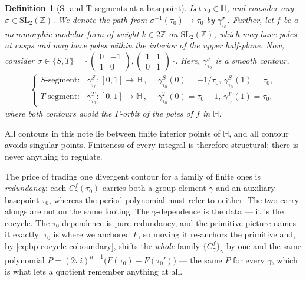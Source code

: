 \documentclass[11pt]{article}
\newtheorem{definition}[theorem]{Definition}
\numberwithin{equation}{section}  %
\newcommand{\HH}{\mathbb{H}}
\newcommand{\ZZ}{\mathbb{Z}}
\newcommand{\SLZ}{\mathrm{SL}_2(\ZZ)}
\begin{document}
\begin{definition}[S- and T-segments at a basepoint]\label{def:contours}
Let $\tau_0 \in \HH$, and consider any $\sigma \in \SLZ$. We denote the
path from $\sigma^{-1}(\tau_0) \to \tau_0$ by
$\gamma^\sigma_{\tau_0}$.
Further, let $f$ be a meromorphic modular form of weight $k \in 2\ZZ$ on
$\SLZ$, which may have poles at cusps and may have poles within the
interior of the upper half-plane.
Now, consider $\sigma \in \{ S, T \} = 
\{ \left( \begin{smallmatrix} 0 & -1 \\ 1 & 0 \end{smallmatrix}\right), 
\left( \begin{smallmatrix} 1 & 1 \\ 0 & 1 \end{smallmatrix}\right) \}$. Here, 
$\gamma^\sigma_{\tau_0}$ is a smooth contour,
\begin{align}
\begin{cases}
  S\text{-segment}\colon\:\:\; \gamma^S_{\tau_0}:[0, 1] \to \HH~,&~~
  \gamma^S_{\tau_0}(0)=-1/\tau_0,\, \gamma^S_{\tau_0}(1) =\tau_0,
  \\
  T\text{-segment}\colon\:\:\; \gamma^T_{\tau_0}:[0, 1] \to \HH~,&~~
  \gamma^T_{\tau_0}(0)=\tau_0-1,\, \gamma^T_{\tau_0}(1) =\tau_0,
\end{cases}
\label{eq:contour-pair}
\end{align}
where both contours avoid the $\Gamma$-orbit of the poles of $f$ in
$\HH$.
\end{definition}
 
All contours in this note lie between finite interior points of $\HH$, 
and all contour avoids singular points.  Finiteness of every integral is therefore 
structural; there is never anything to regulate.
 
The price of trading one divergent contour for a family of finite ones is
\emph{redundancy}: each $C^f_\gamma(\tau_0)$ carries both a group element
$\gamma$ and an auxiliary basepoint $\tau_0$, whereas the period polynomial
must refer to neither.  The two carry-alongs are not on the same footing.
The $\gamma$-dependence is the data --- it is the cocycle.  The
$\tau_0$-dependence is pure redundancy, and the primitive picture names it
exactly: $\tau_0$ is where we anchored $F$, so moving it re-anchors the
primitive and, by \eqref{eq:bp-cocycle-coboundary}, shifts the \emph{whole}
family $\{C^f_\gamma\}_\gamma$ by one and the same polynomial
$P = (2\pi i)^{n+1}\bigl(F(\tau_0)-F(\tau_0')\bigr)$ --- the same $P$ for
every $\gamma$, which is what lets a quotient remember anything at all.
\end{document}
